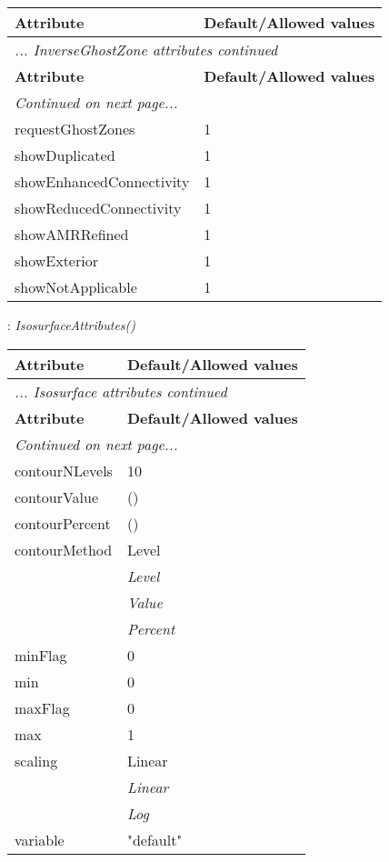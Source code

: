 \documentclass[10pt,a4paper]{report}
\begin{document}
\begin{longtable}{ll}
{\bf Attribute} & {\bf Default/Allowed values} \\
\hline \hline
\endfirsthead
\multicolumn{2}{l}{{\it ... InverseGhostZone attributes continued}} \\
{\bf Attribute} & {\bf Default/Allowed values} \\
\hline \hline
\endhead
\hline
\multicolumn{2}{l}{{\it Continued on next page...}} \\
\endfoot
\hline
\endlastfoot

requestGhostZones  &  1 \\
showDuplicated  &  1 \\
showEnhancedConnectivity  &  1 \\
showReducedConnectivity  &  1 \\
showAMRRefined  &  1 \\
showExterior  &  1 \\
showNotApplicable  &  1 \\
\end{longtable}

\newpage

{}
: {\it IsosurfaceAttributes() }\\[-3mm]

\begin{longtable}{ll}
{\bf Attribute} & {\bf Default/Allowed values} \\
\hline \hline
\endfirsthead
\multicolumn{2}{l}{{\it ... Isosurface attributes continued}} \\
{\bf Attribute} & {\bf Default/Allowed values} \\
\hline \hline
\endhead
\hline
\multicolumn{2}{l}{{\it Continued on next page...}} \\
\endfoot
\hline
\endlastfoot

contourNLevels  &  10 \\
contourValue  &  () \\
contourPercent  &  () \\
contourMethod  &  Level   \\
 & {\it  Level} \\
 & {\it  Value} \\
 & {\it  Percent} \\
minFlag  &  0 \\
min  &  0 \\
maxFlag  &  0 \\
max  &  1 \\
scaling  &  Linear   \\
 & {\it  Linear} \\
 & {\it  Log} \\
variable  &  "default" \\
\end{longtable}
\end{document}
